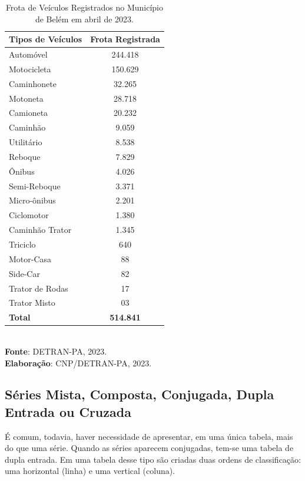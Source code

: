 \begin{table}[!htb]
    \centering
    {
    \caption{Frota de Veículos Registrados no Município de Belém em abril de 2023.}
    \label{obitos2}
    \vspace{0.1cm}
\begin{tabular}{l|c}
\hline\hline
\textbf{Tipos de Veículos}   & \textbf{Frota Registrada} \\
\hline\hline
Automóvel       &  244.418   \\
Motocicleta     &  150.629 \\
Caminhonete     &  32.265  \\
Motoneta        &  28.718  \\
Camioneta       &  20.232  \\
Caminhão        &  9.059   \\
Utilitário      &  8.538   \\
Reboque         &  7.829   \\ 
Ônibus          &  4.026   \\
Semi-Reboque    &  3.371   \\
Micro-ônibus    &  2.201   \\
Ciclomotor      &  1.380   \\
Caminhão Trator &  1.345   \\
Triciclo        &  640     \\
Motor-Casa      &  88      \\
Side-Car        &  82      \\
Trator de Rodas &  17      \\
Trator Misto    &  03     \\
\hline\hline
\textbf{Total}  & \textbf{514.841}   \\
\hline\hline
\end{tabular}}
\\
\hspace{-2.6cm} 
\textbf{Fonte}: DETRAN-PA, 2023. \\ 
\hspace{-1.0cm}
\textbf{Elaboração}: CNP/DETRAN-PA, 2023.
\end{table}





\newpage
\subsection{Séries Mista, Composta, Conjugada, Dupla Entrada ou Cruzada}

É comum, todavia, haver necessidade de apresentar, em uma única tabela, mais do que uma série. Quando as séries aparecem conjugadas, tem-se uma tabela de dupla entrada. Em uma tabela desse tipo são criadas duas ordens de classificação: uma horizontal (linha) e uma vertical (coluna).



